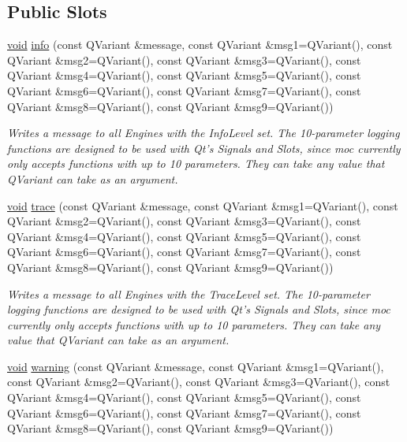 \subsection*{Public Slots}
\begin{DoxyCompactItemize}
\item 
\hyperlink{group___u_a_v_objects_plugin_ga444cf2ff3f0ecbe028adce838d373f5c}{void} \hyperlink{class_qxt_logger_a4a58f3cb4c09722eaa8d4779f57082aa}{info} (const Q\-Variant \&message, const Q\-Variant \&msg1=Q\-Variant(), const Q\-Variant \&msg2=Q\-Variant(), const Q\-Variant \&msg3=Q\-Variant(), const Q\-Variant \&msg4=Q\-Variant(), const Q\-Variant \&msg5=Q\-Variant(), const Q\-Variant \&msg6=Q\-Variant(), const Q\-Variant \&msg7=Q\-Variant(), const Q\-Variant \&msg8=Q\-Variant(), const Q\-Variant \&msg9=Q\-Variant())
\begin{DoxyCompactList}\small\item\em Writes a message to all Engines with the Info\-Level set. The 10-\/parameter logging functions are designed to be used with Qt's Signals and Slots, since moc currently only accepts functions with up to 10 parameters. They can take any value that Q\-Variant can take as an argument. \end{DoxyCompactList}\item 
\hyperlink{group___u_a_v_objects_plugin_ga444cf2ff3f0ecbe028adce838d373f5c}{void} \hyperlink{class_qxt_logger_a88f8e777ac73e35bb1a9a76956a2970b}{trace} (const Q\-Variant \&message, const Q\-Variant \&msg1=Q\-Variant(), const Q\-Variant \&msg2=Q\-Variant(), const Q\-Variant \&msg3=Q\-Variant(), const Q\-Variant \&msg4=Q\-Variant(), const Q\-Variant \&msg5=Q\-Variant(), const Q\-Variant \&msg6=Q\-Variant(), const Q\-Variant \&msg7=Q\-Variant(), const Q\-Variant \&msg8=Q\-Variant(), const Q\-Variant \&msg9=Q\-Variant())
\begin{DoxyCompactList}\small\item\em Writes a message to all Engines with the Trace\-Level set. The 10-\/parameter logging functions are designed to be used with Qt's Signals and Slots, since moc currently only accepts functions with up to 10 parameters. They can take any value that Q\-Variant can take as an argument. \end{DoxyCompactList}\item 
\hyperlink{group___u_a_v_objects_plugin_ga444cf2ff3f0ecbe028adce838d373f5c}{void} \hyperlink{class_qxt_logger_a4bedc4fcc67a6765c89e39db00481df7}{warning} (const Q\-Variant \&message, const Q\-Variant \&msg1=Q\-Variant(), const Q\-Variant \&msg2=Q\-Variant(), const Q\-Variant \&msg3=Q\-Variant(), const Q\-Variant \&msg4=Q\-Variant(), const Q\-Variant \&msg5=Q\-Variant(), const Q\-Variant \&msg6=Q\-Variant(), const Q\-Variant \&msg7=Q\-Variant(), const Q\-Variant \&msg8=Q\-Variant(), const Q\-Variant \&msg9=Q\-Variant())

\end{DoxyCompactItemize}

